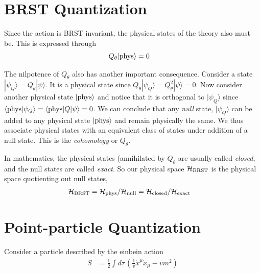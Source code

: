 \documentclass[notitlepage,amsmath,amssymb,aps, pra, 10pt]{revtex4-1}
\begin{document}
\section{BRST Quantization}
    Since the action is BRST invariant, the physical states of the theory also must be. This is expressed through
    \begin{align}
        Q_{\theta} | \rm phys \rangle &=0
    \end{align}

    The nilpotence of $Q_{\theta}$ also has another important consequence. Consider a state $| \psi_Q  \rangle = Q_{\theta} | \psi \rangle$. It is a physical state since $Q_{\theta} |\psi_Q \rangle = Q_{\theta}^2 | \psi \rangle = 0$. Now consider another physical state $| {\rm phys} \rangle$ and notice that it is orthogonal to $|\psi_Q\rangle$ since $\langle {\rm phys} | \psi_Q \rangle = \langle {\rm phys} |Q| \psi\rangle = 0$. We can conclude that any \emph{null} state, $|\psi_Q\rangle$ can be added to any physical state $| {\rm phys} \rangle$ and remain physically the same. We thus associate physical states with an equivalent class of states under addition of a null state. This is the \emph{cohomology} or $Q_{\theta}$.

    In mathematics, the physical states (annihilated by $Q_{\theta}$ are usually called \emph{closed}, and the null states are called \emph{exact}. So our physical space $\mathcal{H}_{\rm BRST}$ is the physical space quotienting out null states,
    \begin{align}
        \mathcal{H}_{\rm BRST} &=  \mathcal{H}_{\rm phys} / \mathcal{H}_{\rm null}   = \mathcal{H}_{\rm closed} / \mathcal{H}_{\rm exact}
    \end{align}

\section{Point-particle Quantization}
    Consider a particle described by the einbein action
    \begin{align}
        S &= \frac{1}{2} \int d\tau \, \left(\frac{1}{v}\dot x^{\mu}\dot x_{\mu} - v m^2  \right)
    \end{align}
\end{document}
